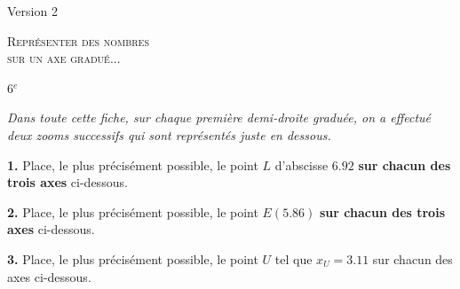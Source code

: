 \documentclass[a4paper,10pt,fleqn,twocolumn,landscape]{article}
\newcommand{\axesZoomBis}[5]{
{} \hfill 
\begin{tikzpicture}
	\def\XA{#1} %
	\def\Nom{#2} %
	\def\Xmin{#3} %
	\setboolean{affichePointilles}{true}  %
	\setboolean{affichePoint}{#4} %
	\setboolean{afficheGraduations}{#5} %
	\setboolean{demiDroite}{true} %
	
	
	\ifthenelse{\boolean{demiDroite}}
	{
		\def\DebordementAGauche{0} %
	}
	{
		\def\DebordementAGauche{0.5} %
	}	
	
	\pgfmathparse{int(\Xmin+10)}\let\Xmax\pgfmathresult; %
		
	\pgfmathparse{int(\XA)}\let\Unites\pgfmathresult;
	\pgfmathparse{int((\XA-\Unites)*10)}\let\Dixiemes\pgfmathresult;
	\pgfmathparse{int(round((\XA-\Unites.\Dixiemes)*100))}\let\Centiemes\pgfmathresult;	

	\pgfmathparse{int(\Unites+1)}\let\UnitesMaj\pgfmathresult;
	\pgfmathparse{int(\Dixiemes+1)}\let\DixiemesMaj\pgfmathresult;
	\pgfmathparse{int(\Centiemes+1)}\let\CentiemesMaj\pgfmathresult;				

	\pgfmathparse{\Xmax+1}\let\Xfleche\pgfmathresult;
	\ifthenelse{\equal{\Xmin}{0}}
	{
		\def\Xorigine{\Xmin} 	
	}
	{
		\pgfmathparse{\Xmin-0.5}\let\Xorigine\pgfmathresult;	
	}

	\pgfmathparse{int(\Xmax-1)}\let\XmaxMoinsUn\pgfmathresult;
	\pgfmathparse{int(\Xmin+1)}\let\XminPlusUn\pgfmathresult;
		
	
	\draw[->,>=latex] (\Xorigine,0) -- (\Xfleche,0);
	\foreach \x in {\XminPlusUn,...,\XmaxMoinsUn}{
		\ifthenelse{\boolean{afficheGraduations}}
		{
			\draw (\x,-.1) -- (\x,.1) node[above] {\x};
		}
		{
			\draw (\x,-.1) -- (\x,.1);
		}
	};
	\foreach \x in {1,...,9}{
		\draw (\Unites.\x,-.05) -- (\Unites.\x,.05);
	}
	\draw (\Xmin,-.1) -- (\Xmin,.1) node[above] {\Xmin};
	\draw (\Xmax,-.1) -- (\Xmax,.1) node[above] {\Xmax};
	\ifthenelse{\not\equal{\Unites}{0}}
	{
		\pgfmathparse{\Xmin-0.5}\let\Xorigine\pgfmathresult;		
	}{}
	\draw[->,>=latex] (\Xorigine,-2) -- (\Xfleche,-2);
	\foreach \x in {1,...,9}{
		\pgfmathparse{int(\Xmin+\x)}\let\X\pgfmathresult;
		\ifthenelse{\boolean{afficheGraduations}}
		{
			\draw (\X,-2.1) -- (\X,-1.9) node[above] {\Unites,\x};
		}
		{
			\draw (\X,-2.1) -- (\X,-1.9);
		}		
		\pgfmathparse{int(\Dixiemes+\Xmin)+\x/10}\let\Xtirets\pgfmathresult;
		\draw (\Xtirets,-2.05) -- (\Xtirets,-1.95);
	};
	
	\ifthenelse{\boolean{afficheGraduations}}
	{	
		\draw (\Xmax,-2.1) -- (\Xmax,-1.9) node[above] {\UnitesMaj};
		\draw (\Xmin,-2.1) -- (\Xmin,-1.9) node[above] {\Unites};
	}
	{
		\draw (\Xmax,-2.1) -- (\Xmax,-1.9) ;
		\draw (\Xmin,-2.1) -- (\Xmin,-1.9) ;		
	}
	
	\pgfmathparse{int(\Dixiemes+\Xmin)}\let\XGaucheAxeBis\pgfmathresult;
	\pgfmathparse{int(\XGaucheAxeBis+1)}\let\XDroitAxeBis\pgfmathresult;

	\ifthenelse{\boolean{affichePointilles}}
	{
	\draw[dashed] (\Unites,0) -- (\Xmin,-2);
	\draw[dashed] (\UnitesMaj,0) -- (\Xmax,-2);
	\draw[dashed] (\XGaucheAxeBis,-2) -- (\Xmin,-4);
	\draw[dashed] (\XDroitAxeBis,-2) -- (\Xmax,-4);
	}{}
	
	\ifthenelse{\not\equal{\Dixiemes}{0}}
	{
		\pgfmathparse{\Xmin-0.5}\let\Xorigine\pgfmathresult;		
	}{}
	\draw[->,>=latex] (\Xorigine,-4) -- (\Xfleche,-4);
	\foreach \x in {1,...,9}{
		\pgfmathparse{int(\Xmin+\x)}\let\X\pgfmathresult;
		\ifthenelse{\boolean{afficheGraduations}}
			{
			\draw (\X,-4.1) -- (\X,-3.9) node[above] {\Unites,\Dixiemes\x};
			}
			{
			\draw (\X,-4.1) -- (\X,-3.9) ;
			}
		};

	
\ifthenelse{\boolean{afficheGraduations}}
	{
	\ifthenelse{\equal{\Dixiemes}{9}}
		{
		\draw (\Xmax,-4.1) -- (\Xmax,-3.9) node[above] {\UnitesMaj};		
		}	
		{
		\draw (\Xmax,-4.1) -- (\Xmax,-3.9) node[above] {\Unites,\DixiemesMaj};
		}	
	
	\ifthenelse{\equal{\Dixiemes}{0}}
		{
		\draw (\Xmin,-4.1) -- (\Xmin,-3.9) node[above] {\Unites};
		}
		{
		\draw (\Xmin,-4.1) -- (\Xmin,-3.9) node[above] {\Unites,\Dixiemes};	
		}
	}
	{
	\ifthenelse{\equal{\Dixiemes}{9}}
		{
		\draw (\Xmax,-4.1) -- (\Xmax,-3.9);		
		}	
		{
		\draw (\Xmax,-4.1) -- (\Xmax,-3.9) ;
		}	
	
	\ifthenelse{\equal{\Dixiemes}{0}}
		{
		\draw (\Xmin,-4.1) -- (\Xmin,-3.9) ;
		}
		{
		\draw (\Xmin,-4.1) -- (\Xmin,-3.9) ;	
		}
	\pgfmathparse{int(\Centiemes+\Xmin)}\let\XGaucheAxeTer\pgfmathresult;
	\draw (\XGaucheAxeTer,-4.1) node[below] {\Nom};
	}
	
	\ifthenelse{\boolean{affichePoint}}
	{
		\draw (\XA,0) node[below] {\Nom};
		\draw (\XGaucheAxeBis.\Centiemes,-2.1) node[below] {\Nom};
	}{}
	
	\draw (7,0) node[below] {$D$};
	\draw (6,-2.1) node[below] {$E$};
\end{tikzpicture}
}
\newcommand{\axesZoomTer}[5]{
{} \hfill 
\begin{tikzpicture}
	\def\XA{#1} %
	\def\Nom{#2} %
	\def\Xmin{#3} %
	\setboolean{affichePointilles}{true}  %
	\setboolean{affichePoint}{#4} %
	\setboolean{afficheGraduations}{#5} %
	\setboolean{demiDroite}{true} %
	
	
	\ifthenelse{\boolean{demiDroite}}
	{
		\def\DebordementAGauche{0} %
	}
	{
		\def\DebordementAGauche{0.5} %
	}	
	
	\pgfmathparse{int(\Xmin+10)}\let\Xmax\pgfmathresult; %
		
	\pgfmathparse{int(\XA)}\let\Unites\pgfmathresult;
	\pgfmathparse{int((\XA-\Unites)*10)}\let\Dixiemes\pgfmathresult;
	\pgfmathparse{int(round((\XA-\Unites.\Dixiemes)*100))}\let\Centiemes\pgfmathresult;	

	\pgfmathparse{int(\Unites+1)}\let\UnitesMaj\pgfmathresult;
	\pgfmathparse{int(\Dixiemes+1)}\let\DixiemesMaj\pgfmathresult;
	\pgfmathparse{int(\Centiemes+1)}\let\CentiemesMaj\pgfmathresult;				

	\pgfmathparse{\Xmax+1}\let\Xfleche\pgfmathresult;
	\ifthenelse{\equal{\Xmin}{0}}
	{
		\def\Xorigine{\Xmin} 	
	}
	{
		\pgfmathparse{\Xmin-0.5}\let\Xorigine\pgfmathresult;	
	}

	\pgfmathparse{int(\Xmax-1)}\let\XmaxMoinsUn\pgfmathresult;
	\pgfmathparse{int(\Xmin+1)}\let\XminPlusUn\pgfmathresult;
		
	
	\draw[->,>=latex] (\Xorigine,0) -- (\Xfleche,0);
	\foreach \x in {\XminPlusUn,...,\XmaxMoinsUn}{
		\ifthenelse{\boolean{afficheGraduations}}
		{
			\draw (\x,-.1) -- (\x,.1) node[above] {\x};
		}
		{
			\draw (\x,-.1) -- (\x,.1);
		}
	};
	\foreach \x in {1,...,9}{
		\draw (\Unites.\x,-.05) -- (\Unites.\x,.05);
	}
	\draw (\Xmin,-.1) -- (\Xmin,.1) node[above] {\Xmin};
	\draw (\Xmax,-.1) -- (\Xmax,.1) node[above] {\Xmax};
	\ifthenelse{\not\equal{\Unites}{0}}
	{
		\pgfmathparse{\Xmin-0.5}\let\Xorigine\pgfmathresult;		
	}{}
	\draw[->,>=latex] (\Xorigine,-2) -- (\Xfleche,-2);
	\foreach \x in {1,...,9}{
		\pgfmathparse{int(\Xmin+\x)}\let\X\pgfmathresult;
		\ifthenelse{\boolean{afficheGraduations}}
		{
			\draw (\X,-2.1) -- (\X,-1.9) node[above] {\Unites,\x};
		}
		{
			\draw (\X,-2.1) -- (\X,-1.9);
		}		
		\pgfmathparse{int(\Dixiemes+\Xmin)+\x/10}\let\Xtirets\pgfmathresult;
		\draw (\Xtirets,-2.05) -- (\Xtirets,-1.95);
	};
	
	\ifthenelse{\boolean{afficheGraduations}}
	{	
		\draw (\Xmax,-2.1) -- (\Xmax,-1.9) node[above] {\UnitesMaj};
		\draw (\Xmin,-2.1) -- (\Xmin,-1.9) node[above] {\Unites};
	}
	{
		\draw (\Xmax,-2.1) -- (\Xmax,-1.9) ;
		\draw (\Xmin,-2.1) -- (\Xmin,-1.9) ;		
	}
	
	\pgfmathparse{int(\Dixiemes+\Xmin)}\let\XGaucheAxeBis\pgfmathresult;
	\pgfmathparse{int(\XGaucheAxeBis+1)}\let\XDroitAxeBis\pgfmathresult;

	\ifthenelse{\boolean{affichePointilles}}
	{
	\draw[dashed] (\Unites,0) -- (\Xmin,-2);
	\draw[dashed] (\UnitesMaj,0) -- (\Xmax,-2);
	\draw[dashed] (\XGaucheAxeBis,-2) -- (\Xmin,-4);
	\draw[dashed] (\XDroitAxeBis,-2) -- (\Xmax,-4);
	}{}
	
	\ifthenelse{\not\equal{\Dixiemes}{0}}
	{
		\pgfmathparse{\Xmin-0.5}\let\Xorigine\pgfmathresult;		
	}{}
	\draw[->,>=latex] (\Xorigine,-4) -- (\Xfleche,-4);
	\foreach \x in {1,...,9}{
		\pgfmathparse{int(\Xmin+\x)}\let\X\pgfmathresult;
		\ifthenelse{\boolean{afficheGraduations}}
			{
			\draw (\X,-4.1) -- (\X,-3.9) node[above] {\Unites,\Dixiemes\x};
			}
			{
			\draw (\X,-4.1) -- (\X,-3.9) ;
			}
		};

	
\ifthenelse{\boolean{afficheGraduations}}
	{
	\ifthenelse{\equal{\Dixiemes}{9}}
		{
		\draw (\Xmax,-4.1) -- (\Xmax,-3.9) node[above] {\UnitesMaj};		
		}	
		{
		\draw (\Xmax,-4.1) -- (\Xmax,-3.9) node[above] {\Unites,\DixiemesMaj};
		}	
	
	\ifthenelse{\equal{\Dixiemes}{0}}
		{
		\draw (\Xmin,-4.1) -- (\Xmin,-3.9) node[above] {\Unites};
		}
		{
		\draw (\Xmin,-4.1) -- (\Xmin,-3.9) node[above] {\Unites,\Dixiemes};	
		}
	}
	{
	\ifthenelse{\equal{\Dixiemes}{9}}
		{
		\draw (\Xmax,-4.1) -- (\Xmax,-3.9);		
		}	
		{
		\draw (\Xmax,-4.1) -- (\Xmax,-3.9) ;
		}	
	
	\ifthenelse{\equal{\Dixiemes}{0}}
		{
		\draw (\Xmin,-4.1) -- (\Xmin,-3.9) ;
		}
		{
		\draw (\Xmin,-4.1) -- (\Xmin,-3.9) ;	
		}
	\pgfmathparse{int(\Centiemes+\Xmin)}\let\XGaucheAxeTer\pgfmathresult;
	\draw (\XGaucheAxeTer,-4.1) node[below] {\Nom};
	}
	
	\ifthenelse{\boolean{affichePoint}}
	{
		\draw (\XA,0) node[below] {\Nom};
		\draw (\XGaucheAxeBis.\Centiemes,-2.1) node[below] {\Nom};
	}{}
	
	\draw (10,0) node[below] {$G$};
	\draw (5,-2.1) node[below] {$H$};
	\draw (11,-4.1) node[below] {$I$};
\end{tikzpicture}
}
\newcommand{\axesZoomTerBis}[5]{
{} \hfill 
\begin{tikzpicture}
	\def\XA{#1} %
	\def\Nom{#2} %
	\def\Xmin{#3} %
	\setboolean{affichePointilles}{true}  %
	\setboolean{affichePoint}{#4} %
	\setboolean{afficheGraduations}{#5} %
	\setboolean{demiDroite}{true} %
	
	
	\ifthenelse{\boolean{demiDroite}}
	{
		\def\DebordementAGauche{0} %
	}
	{
		\def\DebordementAGauche{0.5} %
	}	
	
	\pgfmathparse{int(\Xmin+10)}\let\Xmax\pgfmathresult; %
		
	\pgfmathparse{int(\XA)}\let\Unites\pgfmathresult;
	\pgfmathparse{int((\XA-\Unites)*10)}\let\Dixiemes\pgfmathresult;
	\pgfmathparse{int(round((\XA-\Unites.\Dixiemes)*100))}\let\Centiemes\pgfmathresult;	

	\pgfmathparse{int(\Unites+1)}\let\UnitesMaj\pgfmathresult;
	\pgfmathparse{int(\Dixiemes+1)}\let\DixiemesMaj\pgfmathresult;
	\pgfmathparse{int(\Centiemes+1)}\let\CentiemesMaj\pgfmathresult;				

	\pgfmathparse{\Xmax+1}\let\Xfleche\pgfmathresult;
	\ifthenelse{\equal{\Xmin}{0}}
	{
		\def\Xorigine{\Xmin} 	
	}
	{
		\pgfmathparse{\Xmin-0.5}\let\Xorigine\pgfmathresult;	
	}

	\pgfmathparse{int(\Xmax-1)}\let\XmaxMoinsUn\pgfmathresult;
	\pgfmathparse{int(\Xmin+1)}\let\XminPlusUn\pgfmathresult;
		
	
	\draw[->,>=latex] (\Xorigine,0) -- (\Xfleche,0);
	\foreach \x in {\XminPlusUn,...,\XmaxMoinsUn}{
		\ifthenelse{\boolean{afficheGraduations}}
		{
			\draw (\x,-.1) -- (\x,.1) node[above] {\x};
		}
		{
			\draw (\x,-.1) -- (\x,.1);
		}
	};
	\foreach \x in {1,...,9}{
		\draw (\Unites.\x,-.05) -- (\Unites.\x,.05);
	}
	\draw (\Xmin,-.1) -- (\Xmin,.1) node[above] {\Xmin};
	\draw (\Xmax,-.1) -- (\Xmax,.1) node[above] {\Xmax};
	\ifthenelse{\not\equal{\Unites}{0}}
	{
		\pgfmathparse{\Xmin-0.5}\let\Xorigine\pgfmathresult;		
	}{}
	\draw[->,>=latex] (\Xorigine,-2) -- (\Xfleche,-2);
	\foreach \x in {1,...,9}{
		\pgfmathparse{int(\Xmin+\x)}\let\X\pgfmathresult;
		\ifthenelse{\boolean{afficheGraduations}}
		{
			\draw (\X,-2.1) -- (\X,-1.9) node[above] {\Unites,\x};
		}
		{
			\draw (\X,-2.1) -- (\X,-1.9);
		}		
		\pgfmathparse{int(\Dixiemes+\Xmin)+\x/10}\let\Xtirets\pgfmathresult;
		\draw (\Xtirets,-2.05) -- (\Xtirets,-1.95);
	};
	
	\ifthenelse{\boolean{afficheGraduations}}
	{	
		\draw (\Xmax,-2.1) -- (\Xmax,-1.9) node[above] {\UnitesMaj};
		\draw (\Xmin,-2.1) -- (\Xmin,-1.9) node[above] {\Unites};
	}
	{
		\draw (\Xmax,-2.1) -- (\Xmax,-1.9) ;
		\draw (\Xmin,-2.1) -- (\Xmin,-1.9) ;		
	}
	
	\pgfmathparse{int(\Dixiemes+\Xmin)}\let\XGaucheAxeBis\pgfmathresult;
	\pgfmathparse{int(\XGaucheAxeBis+1)}\let\XDroitAxeBis\pgfmathresult;

	\ifthenelse{\boolean{affichePointilles}}
	{
	\draw[dashed] (\Unites,0) -- (\Xmin,-2);
	\draw[dashed] (\UnitesMaj,0) -- (\Xmax,-2);
	\draw[dashed] (\XGaucheAxeBis,-2) -- (\Xmin,-4);
	\draw[dashed] (\XDroitAxeBis,-2) -- (\Xmax,-4);
	}{}
	
	\ifthenelse{\not\equal{\Dixiemes}{0}}
	{
		\pgfmathparse{\Xmin-0.5}\let\Xorigine\pgfmathresult;		
	}{}
	\draw[->,>=latex] (\Xorigine,-4) -- (\Xfleche,-4);
	\foreach \x in {1,...,9}{
		\pgfmathparse{int(\Xmin+\x)}\let\X\pgfmathresult;
		\ifthenelse{\boolean{afficheGraduations}}
			{
			\draw (\X,-4.1) -- (\X,-3.9) node[above] {\Unites,\Dixiemes\x};
			}
			{
			\draw (\X,-4.1) -- (\X,-3.9) ;
			}
		};

	
\ifthenelse{\boolean{afficheGraduations}}
	{
	\ifthenelse{\equal{\Dixiemes}{9}}
		{
		\draw (\Xmax,-4.1) -- (\Xmax,-3.9) node[above] {\UnitesMaj};		
		}	
		{
		\draw (\Xmax,-4.1) -- (\Xmax,-3.9) node[above] {\Unites,\DixiemesMaj};
		}	
	
	\ifthenelse{\equal{\Dixiemes}{0}}
		{
		\draw (\Xmin,-4.1) -- (\Xmin,-3.9) node[above] {\Unites};
		}
		{
		\draw (\Xmin,-4.1) -- (\Xmin,-3.9) node[above] {\Unites,\Dixiemes};	
		}
	}
	{
	\ifthenelse{\equal{\Dixiemes}{9}}
		{
		\draw (\Xmax,-4.1) -- (\Xmax,-3.9);		
		}	
		{
		\draw (\Xmax,-4.1) -- (\Xmax,-3.9) ;
		}	
	
	\ifthenelse{\equal{\Dixiemes}{0}}
		{
		\draw (\Xmin,-4.1) -- (\Xmin,-3.9) ;
		}
		{
		\draw (\Xmin,-4.1) -- (\Xmin,-3.9) ;	
		}
	\pgfmathparse{int(\Centiemes+\Xmin)}\let\XGaucheAxeTer\pgfmathresult;
	\draw (\XGaucheAxeTer,-4.1) node[below] {\Nom};
	}
	
	\ifthenelse{\boolean{affichePoint}}
	{
		\draw (\XA,0) node[below] {\Nom};
		\draw (\XGaucheAxeBis.\Centiemes,-2.1) node[below] {\Nom};
	}{}
	
	\draw (25,0) node[below] {$L$};
	\draw (18,-2.1) node[below] {$M$};
	\draw (24,-4.1) node[below] {$N$};
\end{tikzpicture}
}
\begin{document}
\vfill
\newpage
\setcounter{section}{0}
\setcounter{exo}{0}   	

\begin{minipage}{0.15\linewidth}
Version 2
\end{minipage}\hfill
\begin{minipage}{0.75\linewidth}
\begin{center}
	\textsc{\Large{Représenter des nombres\\ sur un axe gradué...}}
\end{center}
\end{minipage}\hfill
\begin{minipage}{0.1\linewidth}
{} \hfill 6$^e$
\end{minipage}

\medskip

\textit{Dans toute cette fiche, sur chaque première demi-droite graduée, on a effectué deux zooms successifs qui sont représentés juste en dessous.}

\vfill




\textbf{1.} Place, le plus précisément possible, le point $L$ d'abscisse $6.92$ \textbf{sur chacun des trois axes} ci-dessous.

\vfill

{} \hfill 
{}
\hfill {}

\vfill

\textbf{2.} Place, le plus précisément possible, le point $E (5.86)$ \textbf{sur chacun des trois axes} ci-dessous.

\vfill

{} \hfill 
{}
\hfill {}

\vfill

\textbf{3.} Place, le plus précisément possible, le point $U$ tel que $x_{U}=3.11$ sur chacun des axes ci-dessous.

\vfill

{} \hfill 
{}
\hfill {}

\vfill


%
%
%
%
%
%
%
%
%
%
%
%
%
\end{document}
